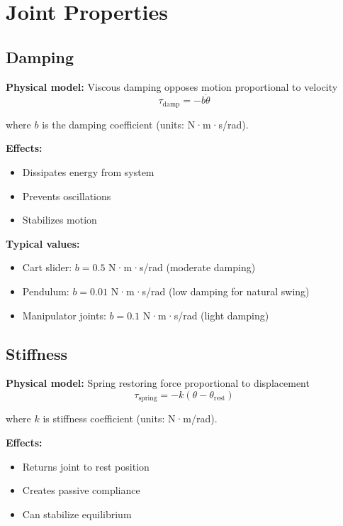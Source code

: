\documentclass[11pt,a4paper]{article}
\begin{document}
\section{Joint Properties}

\subsection{Damping}

\textbf{Physical model:} Viscous damping opposes motion proportional to velocity
\begin{equation}
\tau_{\text{damp}} = -b \dot{\theta}
\end{equation}

where $b$ is the damping coefficient (units: N·m·s/rad).

\textbf{Effects:}
\begin{itemize}
    \item Dissipates energy from system
    \item Prevents oscillations
    \item Stabilizes motion
\end{itemize}

\textbf{Typical values:}
\begin{itemize}
    \item Cart slider: $b = 0.5$ N·m·s/rad (moderate damping)
    \item Pendulum: $b = 0.01$ N·m·s/rad (low damping for natural swing)
    \item Manipulator joints: $b = 0.1$ N·m·s/rad (light damping)
\end{itemize}

\subsection{Stiffness}

\textbf{Physical model:} Spring restoring force proportional to displacement
\begin{equation}
\tau_{\text{spring}} = -k (\theta - \theta_{\text{rest}})
\end{equation}

where $k$ is stiffness coefficient (units: N·m/rad).

\textbf{Effects:}
\begin{itemize}
    \item Returns joint to rest position
    \item Creates passive compliance
    \item Can stabilize equilibrium
\end{itemize}
\end{document}
